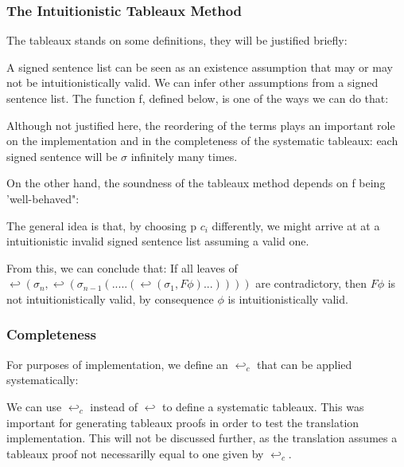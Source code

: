 \documentclass[runningheads]{llncs}
\begin{document}
\subsubsection{The Intuitionistic Tableaux Method }
The tableaux stands on some definitions, they will be justified briefly:
\signedSentenceIntuitionisticDefinition
 

A signed sentence list can be seen as an existence assumption that may or may not be intuitionistically valid. We can infer other assumptions from a  signed sentence list. The function f, defined below, is one of the ways we can do that: 


\fIntuitionisticDefinition


Although not justified here, the reordering of the terms plays an important role on the implementation and in the completeness of the systematic tableaux: 
each signed sentence will be $\sigma$ infinitely many times.

On the other hand, 
the soundness of the tableaux method depends on f being 'well-behaved":

\wellBehavedTheorem

The general idea is that, by choosing p $c_i$ differently, we might arrive at at a intuitionistic invalid signed sentence list assuming a valid one.   

\TableauxDevelopmentListDefinition

\TableauxDevelopmentExampleFigure

\soundnessTheorem



    From this, we can conclude that: 
        If all leaves of $ \hookleftarrow (\sigma_n,\hookleftarrow(\sigma_{n-1}(.....(\hookleftarrow(\sigma_1 , F\phi)...)))) $ are contradictory, then $F\phi$ is not intuitionistically valid, by consequence 
        $\phi$ is intuitionistically valid. 
        

\subsubsection{Completeness }

For purposes of implementation, we define an $\hookleftarrow_c$ that can be applied systematically: 

\completeiteratordefinition

We can use $\hookleftarrow_c$ instead of $\hookleftarrow$ to define a systematic tableaux. This was important for generating tableaux proofs in order to test 
the translation implementation. This will not be discussed further, as the translation assumes a tableaux proof not necessarilly equal to one given by $\hookleftarrow_c$.
\end{document}
